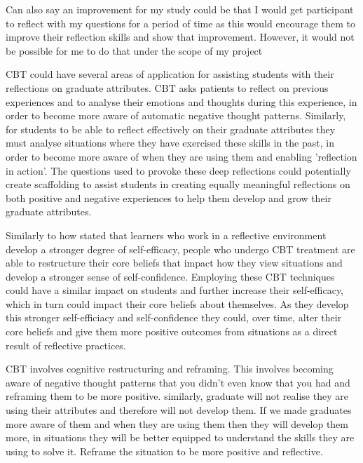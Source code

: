 \documentclass{l4proj}
\begin{document}
Can also say an improvement for my study could be that I would get participant to reflect with my questions for a period of time as this would encourage 
them to improve their reflection skills and show that improvement. However, it would not be possible for me to do that under the scope of my project

CBT could have several areas of application for assisting students with their reflections on graduate attributes. CBT asks patients to reflect on previous
experiences and to analyse their emotions and thoughts during this experience, in order to become more aware of automatic negative thought patterns. Similarly, 
for students to be able to reflect effectively on their graduate attributes they must analyse situations where they have exercised these skills in the past,
in order to become more aware of when they are using them and enabling 'reflection in action'. The questions used to provoke these deep reflections could 
potentially create scaffolding to 
assist students in creating equally meaningful reflections on both positive and negative experiences to help them develop and grow their graduate attributes. 

Similarly to how \citet{bruno_reflective_2018} stated that learners who work in a reflective environment develop a stronger degree of self-efficacy, people 
who undergo CBT treatment are able to restructure their core beliefs that impact how they view situations and develop a stronger sense of self-confidence. 
Employing these CBT techniques could have a similar impact on students and further increase their self-efficacy, which in turn could impact their core beliefs 
about themselves. As they develop this stronger self-efficiacy and self-confidence they could, over time, alter their core beliefs and give them more 
positive outcomes from situations as a direct result of reflective practices.

CBT involves cognitive restructuring and reframing. This involves becoming aware of negative thought patterns that you didn't even know that you had and 
reframing them to be more positive.
similarly, graduate will not realise they are using their attributes and therefore will not develop them. If we made graduates more aware of them and when 
they are using them then they will develop them more, in situations they will be better equipped to understand the skills they are using to solve it. Reframe 
the situation to be more positive and reflective.
\end{document}
